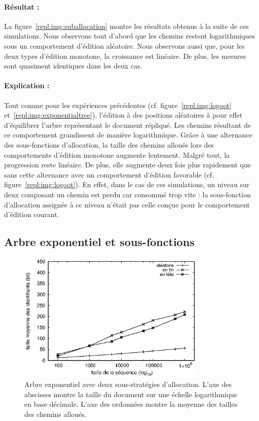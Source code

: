 \paragraph{Résultat :} La figure~\ref{repl:img:suballocation} montre les
résultats obtenus à la suite de ces simulations. Nous observons tout d'abord que
les chemins restent logarithmiques sous un comportement d'édition
aléatoire. Nous observons aussi que, pour les deux types d'édition monotone, la
croissance est linéaire. De plus, les mesures sont quasiment identiques dans les
deux cas.

\paragraph{Explication :} Tout comme pour les expériences précédentes
(cf. figure~\ref{repl:img:logoot} et~\ref{repl:img:exponentialtree}), l'édition
à des positions aléatoires à pour effet d'équilibrer l'arbre représentant le
document répliqué. Les chemins résultant de ce comportement grandissent de
manière logarithmique. Grâce à une alternance des sous-fonctions d'allocation,
la taille des chemins alloués lors des comportements d'édition monotone augmente
lentement. Malgré tout, la progression reste linéaire. De plus, elle augmente
deux fois plus rapidement que sans cette alternance avec un comportement
d'édition favorable (cf. figure~\ref{repl:img:logoot}). En effet, dans le cas de
ces simulations, un niveau sur deux composant un chemin est perdu car consommé
trop vite : la sous-fonction d'allocation assignée à ce niveau n'était pas celle
conçue pour le comportement d'édition courant.


\subsection{Arbre exponentiel et sous-fonctions}

\begin{figure}
  \begin{center}
    \includegraphics[width=0.8\textwidth]{img/lseq/lseq.eps}
    \caption[Combinaison de l'arbre exponentiel et des sous-fonctions
    d'allocation] {\label{repl:img:lseq} Arbre exponentiel avec deux
      sous-stratégies d'allocation. L'axe des abscisses montre la taille du
      document sur une échelle logarithmique en base décimale. L'axe des
      ordonnées montre la moyenne des tailles des chemins alloués.}
  \end{center}
\end{figure}

